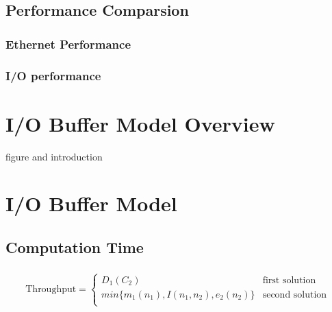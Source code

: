 \documentclass{article}
\begin{document}
	\subsection{Performance Comparsion}
		\subsubsection{Ethernet Performance}
		\subsubsection{I/O performance}


\section{I/O Buffer Model Overview}
figure and introduction


\section{I/O Buffer Model}
	\subsection{Computation Time}
		\subsubsection{}
		
		\begin{equation*}
		
		\text{Throughput}=
			\begin{cases}
				D_1(C_2) & \text{first solution}\\
				min\{m_1(n_1),I(n_1,n_2),e_2(n_2)\} & \text{second solution}\\
			\end{cases}
		\end{equation*}
\end{document}
